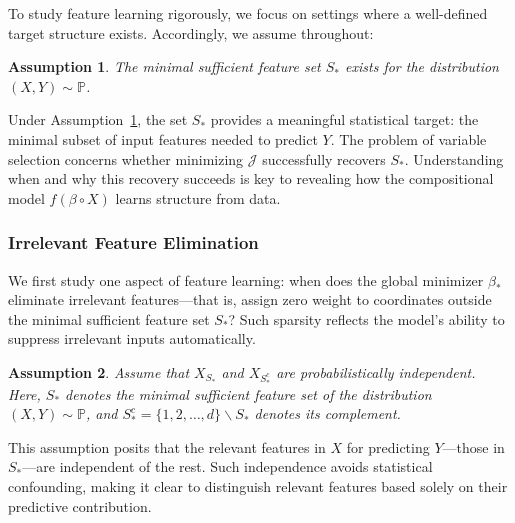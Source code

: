 \documentclass[sn-mathphys-num]{sn-jnl}%
\numberwithin{equation}{section}
\renewcommand{\P}{\mathbb{P}}
\newtheorem{assumption}{Assumption}[section]
\theoremstyle{thmstyleone}%
\theoremstyle{thmstyletwo}%
\theoremstyle{thmstylethree}%
\begin{document}
To study feature learning rigorously, we focus on settings where a well-defined 
target structure exists. Accordingly, we assume throughout: 

\vspace{0.5em} 
\begin{assumption}
\label{assumption:existence-of-csfs}
The minimal sufficient feature set $S_*$ exists for the distribution $(X, Y) \sim \P$. 
\end{assumption} 
\vspace{0.5em} 

Under Assumption~\ref{assumption:existence-of-csfs}, the set $S_*$ provides a meaningful statistical target: 
the minimal subset of input features needed to predict $Y$. The problem of variable selection concerns whether minimizing $\mathcal{J}$ successfully recovers $S_*$. Understanding when and why this recovery succeeds is key to revealing how the compositional model $f(\beta \circ X)$ learns structure from data.




\subsubsection{Irrelevant Feature Elimination} 
We first study one aspect of feature learning: when does the global minimizer $\beta_*$ eliminate irrelevant features---that is, assign zero weight to coordinates outside the minimal sufficient feature set $S_*$? Such sparsity reflects the model’s ability to suppress irrelevant inputs automatically.

\vspace{0.5em}
\begin{assumption}
\label{assumption:independence}
Assume that $X_{S_*}$ and $X_{S_*^c}$ are probabilistically independent. Here, $S_*$ denotes the 
minimal sufficient feature set of the distribution $(X, Y) \sim \P$, and $S_*^c = \{1, 2, \ldots, d\} \backslash S_*$ denotes its complement.
\end{assumption} 

This assumption posits that the relevant features in $X$ for predicting $Y$---those in $S_*$---are independent of the rest. Such independence avoids statistical confounding, making it clear to distinguish relevant features based solely on their predictive contribution. 
\end{document}
